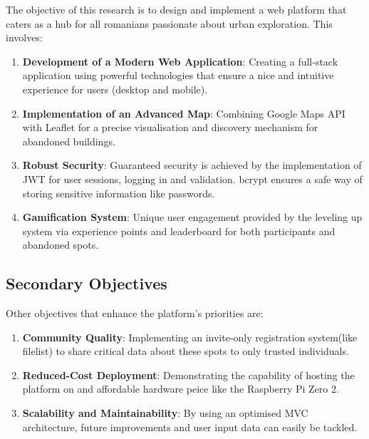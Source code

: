 \documentclass[12pt,a4paper]{report}
\begin{document}
The objective of this research is to design and implement a web platform that caters as a hub for all romanians passionate about urban exploration. This involves:

\begin{enumerate}
    \item \textbf{Development of a Modern Web Application}: Creating a full-stack application using powerful technologies that ensure a nice and intuitive experience for users (desktop and mobile).
    
    \item \textbf{Implementation of an Advanced Map}: Combining Google Maps API with Leaflet for a precise visualisation and discovery mechanism for abandoned buildings.
    
    \item \textbf{Robust Security}: Guaranteed security is achieved by the implementation of JWT for user sessions, logging in and validation. bcrypt ensures a safe way of storing sensitive information like passwords.
    
    \item \textbf{Gamification System}: Unique user engagement provided by the leveling up system via experience points and leaderboard for both participants and abandoned spots.
\end{enumerate}

\subsection*{Secondary Objectives}

Other objectives that enhance the platform's priorities are:

\begin{enumerate}
    \item \textbf{Community Quality}: Implementing an invite-only registration system(like filelist) to share critical data about these spots to only trusted individuals.
    
    \item \textbf{Reduced-Cost Deployment}: Demonstrating the capability of hosting the platform on and affordable hardware peice like the Raspberry Pi Zero 2.
    
    \item \textbf{Scalability and Maintainability}: By using an optimised MVC architecture, future improvements and user input data can easily be tackled.

\end{enumerate}
\end{document}
